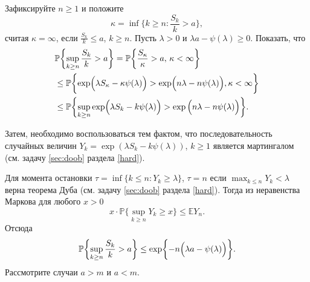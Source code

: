 \begin{ordre}
Зафиксируйте $n\geq 1$ и положите 
\begin{equation*}
\kappa  = \inf \biggl\{k\geq n: \frac{S_k}{k}>a\biggr\}, 
\end{equation*}
считая $\kappa = \infty$, если $\frac{S_k}{k}\leq a$, $k\geq n$.
Пусть $\lambda>0$  и $\lambda a - \psi(\lambda)\geq 0$. 
Показать, что 
\begin{equation*}
\begin{split}
&\mathbb{P}\biggl\{\sup_{k\geq n}\frac{S_k}{k}>a\biggr\} = \mathbb{P}\biggl\{\frac{S_{\kappa}}{\kappa}>a,\,\kappa<\infty\biggr\} \\
&\leq \mathbb{P}\biggl\{\exp\Bigl(\lambda S_{\kappa} - \kappa  \psi (\lambda)\Bigr)>\exp\Bigl(n\lambda -n  \psi(\lambda)\Bigr),\kappa<\infty \biggr\}\\
&\leq 
 \mathbb{P}\biggl\{\sup_{k\geq n}\exp\Bigl(\lambda S_{k} - k  \psi (\lambda)\Bigr)>\exp\Big(n\lambda -n  \psi(\lambda)\Bigr)\biggr\}.
\end{split}
\end{equation*}

Затем, необходимо воспользоваться тем фактом, что последовательность случайных величин $Y_k = \exp (\lambda S_k-k \psi(\lambda))$, $k\geq 1$ является мартингалом (см. задачу \ref{sec:doob}  раздела \ref{hard}).

Для момента остановки
$\tau = \inf \{k\leq n: Y_k\geq \lambda \}$, $\tau = n$ если $\max_{k\leq n}Y_k <\lambda$ верна теорема Дуба (см. задачу \ref{sec:doob}  раздела \ref{hard}).
Тогда  из неравенства Маркова для любого $x>0$
\begin{equation*}
x \cdot \mathbb{P}\biggl\{\sup_{k\geq n} Y_k \geq x\biggr\}\leq \mathbb{E}Y_n.
\end{equation*}
Отсюда
\begin{equation*}
\mathbb{P}\biggl\{\sup_{k\geq n}\frac{S_k}{k}>a\biggr\}\leq \exp\biggl\{-n \Bigl(\lambda a -  \psi(\lambda)\Bigr)\biggr\}.
\end{equation*}
Рассмотрите случаи $a>m$ и $a<m$.

\end{ordre}




